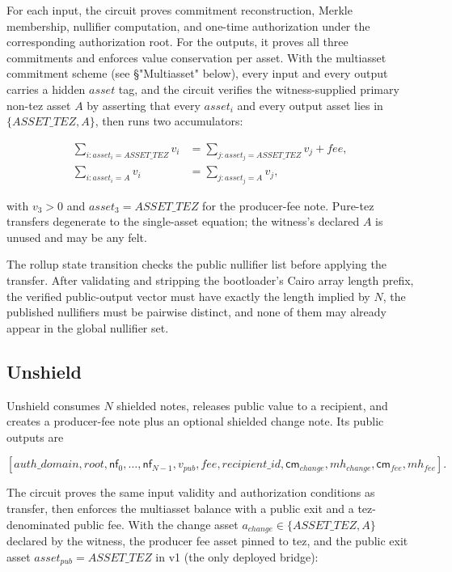 \documentclass[11pt]{article}
\newcommand{\cm}{\mathsf{cm}}
\newcommand{\nf}{\mathsf{nf}}
\begin{document}
For each input, the circuit proves commitment reconstruction, Merkle membership,
nullifier computation, and one-time authorization under the corresponding
authorization root. For the outputs, it proves all three commitments and
enforces value conservation per asset. With the multiasset commitment scheme
(see §"Multiasset" below), every input and every output carries a hidden
\(asset\) tag, and the circuit verifies the witness-supplied primary non-tez
asset \(A\) by asserting that every \(asset_i\) and every output asset lies
in \(\{ASSET\_TEZ, A\}\), then runs two accumulators:

\begin{align*}
\sum_{i : asset_i = ASSET\_TEZ} v_i &= \sum_{j : asset_j = ASSET\_TEZ} v_j + fee, \\
\sum_{i : asset_i = A} v_i &= \sum_{j : asset_j = A} v_j,
\end{align*}

with \(v_3 > 0\) and \(asset_3 = ASSET\_TEZ\) for the producer-fee note.
Pure-tez transfers degenerate to the single-asset equation; the witness's
declared \(A\) is unused and may be any felt.

The rollup state transition checks the public nullifier list before applying the
transfer. After validating and stripping the bootloader's Cairo array length
prefix, the verified public-output vector must have exactly the length implied by
\(N\), the published nullifiers must be pairwise distinct, and none of them may
already appear in the global nullifier set.

\subsection{Unshield}

Unshield consumes \(N\) shielded notes, releases public value to a recipient,
and creates a producer-fee note plus an optional shielded change note. Its
public outputs are

\[
[auth\_domain, root, \nf_0, \ldots, \nf_{N-1}, v_{pub}, fee,
 recipient\_id, \cm_{change}, mh_{change}, \cm_{fee}, mh_{fee}].
\]

The circuit proves the same input validity and authorization conditions as
transfer, then enforces the multiasset balance with a public exit and a
tez-denominated public fee. With the change asset \(a_{change} \in
\{ASSET\_TEZ, A\}\) declared by the witness, the producer fee asset pinned
to tez, and the public exit asset \(asset_{pub} = ASSET\_TEZ\) in v1 (the
only deployed bridge):
\end{document}
